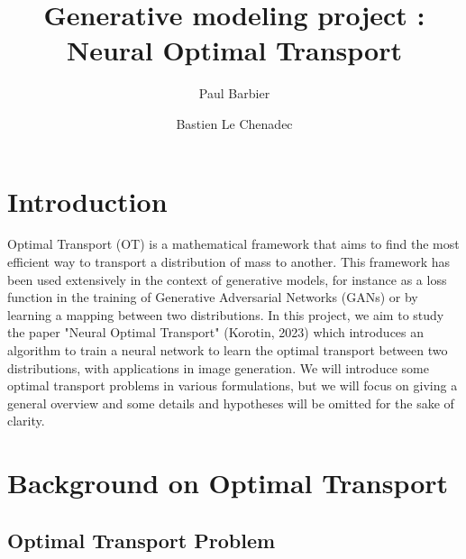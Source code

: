 \documentclass[11pt]{article}
\title{Generative modeling project : Neural Optimal Transport}
\author[1]{Paul Barbier}
\author[1]{Bastien Le Chenadec}
\affil[1]{École des Ponts ParisTech, Master MVA}
\begin{document}
\maketitle

\section{Introduction}

Optimal Transport (OT) is a mathematical framework that aims to find the most efficient way to transport a distribution of mass to another. This framework has been used extensively in the context of generative models, for instance as a loss function in the training of Generative Adversarial Networks (GANs) or by learning a mapping between two distributions. In this project, we aim to study the paper "Neural Optimal Transport" (Korotin, 2023) \cite{korotin-2022} which introduces an algorithm to train a neural network to learn the optimal transport between two distributions, with applications in image generation. We will introduce some optimal transport problems in various formulations, but we will focus on giving a general overview and some details and hypotheses will be omitted for the sake of clarity.

\section{Background on Optimal Transport}

\subsection{Optimal Transport Problem}
\end{document}
